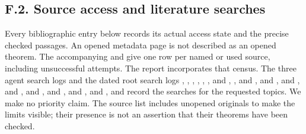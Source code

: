 \subsection{F.2. Source access and literature searches}
Every bibliographic entry below records its actual access state and the
precise checked passages. An opened metadata page is not described as
an opened theorem. The accompanying 
and  give one row per named or used source,
including unsuccessful attempts. The report incorporates that census.
The three agent search logs and the dated root search logs
, ,
, ,
, , and
, , and
, and
, and
, and
, and
, and
, and
, and
, and
record the searches for the requested topics. We make no priority claim.
The source list includes unopened originals to make the limits visible;
their presence is not an assertion that their theorems have been checked.
